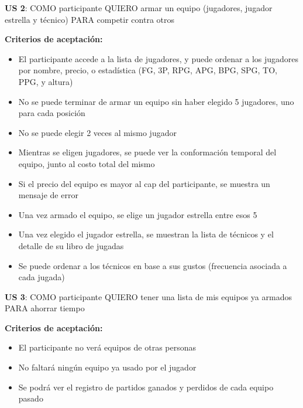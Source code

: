 \begin{tcolorbox}
\textbf{US 2}: COMO participante QUIERO armar un equipo (jugadores, jugador estrella y técnico) PARA competir contra otros

\vline

\textbf{Criterios de aceptación:}
\begin{itemize}
\item El participante accede a la lista de jugadores, y puede ordenar a los jugadores por nombre, precio, o estadística (FG, 3P, RPG, APG, BPG, SPG, TO, PPG, y altura)
\item No se puede terminar de armar un equipo sin haber elegido 5 jugadores, uno para cada posición 
\item No se puede elegir 2 veces al mismo jugador
\item Mientras se eligen jugadores, se puede ver la conformación temporal del equipo, junto al costo total del mismo
\item Si el precio del equipo es mayor al cap del participante, se muestra un mensaje de error
\item Una vez armado el equipo, se elige un jugador estrella entre esos 5
\item Una vez elegido el jugador estrella, se muestran la lista de técnicos y el detalle de su libro de jugadas
\item Se puede ordenar a los técnicos en base a sus gustos (frecuencia asociada a cada jugada)
\end{itemize}
\end{tcolorbox}
\vspace{10pt}

\begin{tcolorbox}
\textbf{US 3}: COMO participante QUIERO tener una lista de mis equipos ya armados PARA ahorrar tiempo

\vline

\textbf{Criterios de aceptación:}
\begin{itemize}
\item El participante no verá equipos de otras personas
\item No faltará ningún equipo ya usado por el jugador
\item Se podrá ver el registro de partidos ganados y perdidos de cada equipo pasado
\end{itemize}
\end{tcolorbox}
\vspace{10pt}


